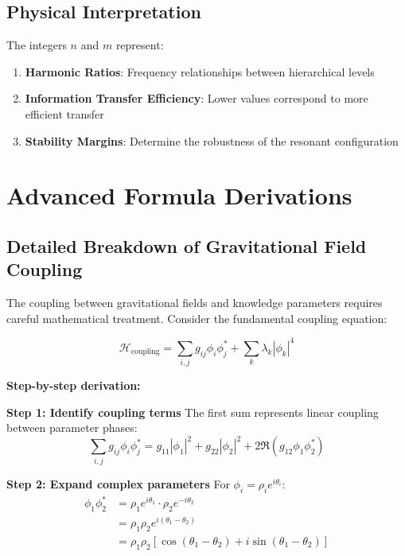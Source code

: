 \subsection{Physical Interpretation}

The integers $n$ and $m$ represent:
\begin{enumerate}
    \item \textbf{Harmonic Ratios}: Frequency relationships between hierarchical levels
    \item \textbf{Information Transfer Efficiency}: Lower values correspond to more efficient transfer
    \item \textbf{Stability Margins}: Determine the robustness of the resonant configuration
\end{enumerate}

\section{Advanced Formula Derivations}

\subsection{Detailed Breakdown of Gravitational Field Coupling}

The coupling between gravitational fields and knowledge parameters requires careful mathematical treatment. Consider the fundamental coupling equation:

\begin{equation}
\mathcal{H}_{\text{coupling}} = \sum_{i,j} g_{ij} \phi_i \phi_j^* + \sum_k \lambda_k |\phi_k|^4
\end{equation}

\textbf{Step-by-step derivation:}

\textbf{Step 1: Identify coupling terms}
The first sum represents linear coupling between parameter phases:
\begin{equation}
\sum_{i,j} g_{ij} \phi_i \phi_j^* = g_{11}|\phi_1|^2 + g_{22}|\phi_2|^2 + 2\Re(g_{12}\phi_1\phi_2^*)
\end{equation}

\textbf{Step 2: Expand complex parameters}
For $\phi_i = \rho_i e^{i\theta_i}$:
\begin{align}
\phi_1\phi_2^* &= \rho_1 e^{i\theta_1} \cdot \rho_2 e^{-i\theta_2} \\
&= \rho_1\rho_2 e^{i(\theta_1-\theta_2)} \\
&= \rho_1\rho_2[\cos(\theta_1-\theta_2) + i\sin(\theta_1-\theta_2)]
\end{align}

